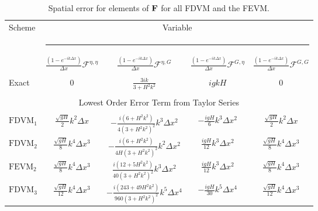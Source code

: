 \begin{table}
	\centering
	\begin{adjustbox}{}
		\begin{tabular}{l c c c c}
			Scheme &\multicolumn{4}{c}{Variable}\\
			&  \multicolumn{4}{l}{\rule{0.95\textwidth}{0.4pt}} \\
			& $\frac{\left(1 - e^{-ik\Delta x}\right)}{\Delta x}\mathcal{F}^{\eta,\eta}$& $\frac{\left(1 - e^{-ik\Delta x}\right)}{\Delta x} \mathcal{F}^{\eta,G}$& $ \frac{\left(1 - e^{-ik\Delta x}\right)}{\Delta x} \mathcal{F}^{G,\eta}$ & $\frac{\left(1 - e^{-ik\Delta x}\right)}{\Delta x} \mathcal{F}^{G,G}$ \\
			\hline \\
			Exact &  $0$& $\frac{3ik}{3 +H^2k^2}$ & ${igkH}$ & $0$\\
			\\ \hline \multicolumn{5}{c}{Lowest Order Error Term from Taylor Series} \\ \hline\\
			$\text{FDVM}_1$ & $\frac{\sqrt{gH}}{2}k^2 \Delta x$& $ -\frac{i\left(6 + H^2k^2\right)}{4 \left(3 + H^2k^2\right)^2} k^3 \Delta x^2$& $-\frac{igH}{6}k^3 \Delta x^2$&$\frac{\sqrt{gH}}{2}k^2 \Delta x$ \\ [5mm]
			$\text{FDVM}_2$ & $\frac{\sqrt{gH}}{8}k^4 \Delta x^3$& $-\frac{i\left(6 +H^2k^2\right)}{4H \left(3 + H^2k^2\right)^2}k^2 \Delta x^2$& $\frac{igH}{12}k^3 \Delta x^2$&$\frac{\sqrt{gH}}{8}k^4 \Delta x^3$ \\ [5mm]
			$\text{FEVM}_2$ & $\frac{\sqrt{gH}}{8}k^4 \Delta x^3$& $ \frac{i\left(12 + 5H^2k^2\right)}{40 \left(3 + H^2k^2\right)^2} k^3 \Delta x^2$& $\frac{igH}{12}k^3 \Delta x^2$&$\frac{\sqrt{gH}}{8}k^4 \Delta x^3$ \\ [5mm]
			$\text{FDVM}_3$ & $\frac{\sqrt{gH}}{12}k^4 \Delta x^3$& $ -\frac{i\left(243 + 49H^2k^2\right)}{960 \left(3 + H^2k^2\right)^2} k^5 \Delta x^4$& $-\frac{igH}{30}k^5 \Delta x^4$&$\frac{\sqrt{gH}}{12}k^4 \Delta x^3$ \\
		\end{tabular}
	\end{adjustbox}
	\caption{Spatial error for elements of $\mathbf{F}$ for all FDVM and the FEVM.}
	\label{tab:Ffactor}
\end{table}
%
